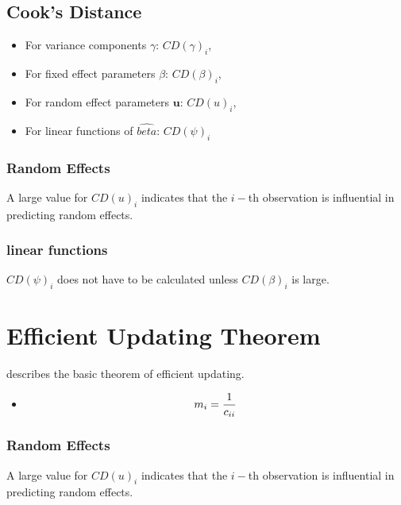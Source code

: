 \documentclass[12pt, a4paper]{article}
\begin{document}
\subsection{Cook's Distance}
\begin{itemize}
	\item For variance components $\gamma$: $CD(\gamma)_i$,
	\item For fixed effect parameters $\beta$: $CD(\beta)_i$,
	\item For random effect parameters $\boldsymbol{u}$: $CD(u)_i$,
	\item For linear functions of $\hat{beta}$: $CD(\psi)_i$
\end{itemize}


\subsubsection{Random Effects}

A large value for $CD(u)_i$ indicates that the $i-$th observation is influential in predicting random effects.

\subsubsection{linear functions}

$CD(\psi)_i$ does not have to be calculated unless $CD(\beta)_i$ is large.





\section{Efficient Updating Theorem} %
\citet{Zewotir} describes the basic theorem of efficient updating.
\begin{itemize}
	\item \[ m_i = {1 \over c_{ii}}\]
\end{itemize}





\subsubsection{Random Effects}


A large value for $CD(u)_i$ indicates that the $i-$th observation is influential in predicting random effects.
\end{document}
